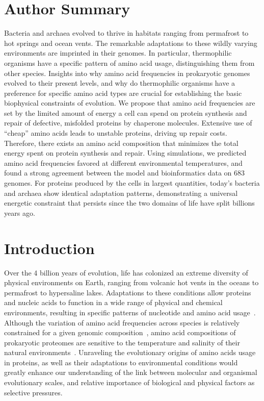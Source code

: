 \documentclass[10pt,letterpaper]{article}
\begin{document}
\section*{Author Summary}

Bacteria and archaea evolved to thrive in habitats ranging from permafrost to hot springs and ocean vents. The remarkable adaptations to these wildly varying environments are imprinted in their genomes. In particular, thermophilic organisms have a specific pattern of amino acid usage, distinguishing them from other species. Insights into why amino acid frequencies in prokaryotic genomes evolved to their present levels, and why do thermophilic organisms have a preference for specific amino acid types are crucial for establishing the basic biophysical constraints of evolution. We propose that amino acid frequencies are set by the limited amount of energy a cell can spend on protein synthesis and repair of defective, misfolded proteins by chaperone molecules. Extensive use of “cheap” amino acids leads to unstable proteins, driving up repair costs. 
Therefore, there exists an amino acid composition that minimizes the total energy spent on protein synthesis and repair. Using simulations, we predicted amino acid frequencies favored at different environmental temperatures, and found a strong agreement between the model and bioinformatics data on 683 genomes. For proteins produced by the cells in largest quantities, today’s bacteria and archaea show identical adaptation patterns, demonstrating a universal energetic constraint that persists since the two domains of life have split billions years ago.

\section*{Introduction}

Over the 4 billion years of evolution, life has colonized an extreme diversity of physical environments on Earth, ranging from volcanic hot vents in the oceans to permafrost to hypersaline lakes. Adaptations to these conditions allow proteins and nucleic acids to function in a wide range of physical and chemical environments, resulting in specific patterns of nucleotide and amino acid usage~\cite{Galtier1997Relationships,Kreil2001Identification,Zeldovich2007Protein,Berezovsky2007Positive,England2003Natural,Fukuchi2003Unique,Sghaier2013There,Sabath2013Growth}. Although the variation of amino acid frequencies across species is relatively constrained for a given genomic  composition~\cite{Krick2014Amino,Goncearenco2014Fundamental}, amino acid compositions of prokaryotic proteomes are sensitive to the temperature and salinity of their natural environments~\cite{Fukuchi2003Unique,Kreil2001Identification}. Unraveling the evolutionary origins of  amino acids usage in proteins, as well as their adaptations to environmental conditions would greatly enhance our understanding of the link between molecular and organismal evolutionary scales, and relative importance of biological and physical factors as selective pressures.
\end{document}
